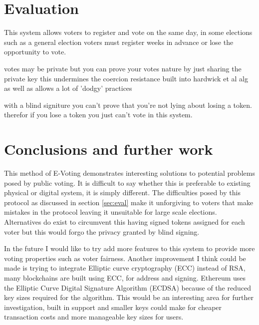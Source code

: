 \documentclass{entcs}
\begin{document}


\section{Evaluation}\label{sec: Eval}
This system allows voters to register and vote on the same day, in some elections such as a general election voters must register weeks in advance or lose the opportunity to vote.

votes may be private but you can prove your votes nature by just sharing the private key this undermines the coercion resistance built into hardwick et al alg as well as allows a lot of 'dodgy' practices

with a blind signiture you can't prove that you're not lying about losing a token. therefor if you lose a token you just can't vote in this system.

\section{Conclusions and further work}
This method of E-Voting demonstrates interesting solutions to potential problems posed by public voting. It is difficult to say whether this is preferable to existing physical or digital system, it is simply different. The difficulties posed by this protocol as discussed in section \ref{sec:eval} make it unforgiving to voters that make mistakes in the protocol leaving it unsuitable for large scale elections. Alternatives do exist to circumvent this having signed tokens assigned for each voter but this would forgo the privacy granted by blind signing. 

In the future I would like to try add more features to this system to provide more voting properties such as voter fairness. Another improvement I think could be made is trying to integrate Elliptic curve cryptography (ECC) instead of RSA, many blockchains are built using ECC, for address and signing. Ethereum uses the Elliptic Curve Digital Signature Algorithm (ECDSA) because of the reduced key sizes required for the algorithm. This would be an interesting area for further investigation, built in support and smaller keys could make for cheaper transaction costs and more manageable key sizes for users.
\printbibliography
\end{document}
